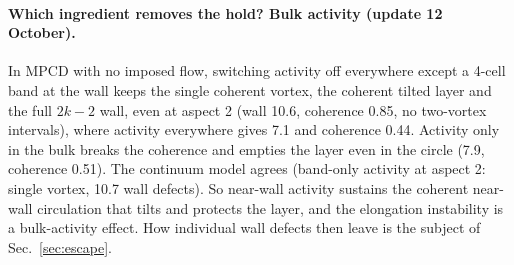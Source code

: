 \documentclass[11pt,a4paper]{article}
\begin{document}
\paragraph{Which ingredient removes the hold? Bulk activity (update 12 October).} In MPCD with no imposed flow, switching activity off everywhere except a 4-cell band at the wall keeps the
single coherent vortex, the coherent tilted layer and the full $2k-2$ wall, even at aspect 2 (wall 10.6, coherence 0.85, no two-vortex intervals), where activity everywhere gives 7.1 and
coherence 0.44. Activity only in the bulk breaks the coherence and empties the layer even in the circle (7.9, coherence 0.51). The continuum model agrees (band-only activity at aspect 2:
single vortex, 10.7 wall defects). So near-wall activity sustains the coherent near-wall circulation that tilts and protects the layer, and the elongation instability is a bulk-activity
effect. How individual wall defects then leave is the subject of Sec.~\ref{sec:escape}.
\end{document}
